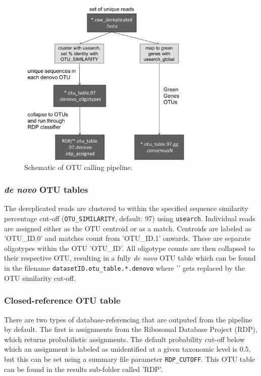 \documentclass[11pt, oneside]{article}   	%
\begin{document}
\begin{figure}
\centering
	\includegraphics[width=0.8\textwidth]{figs/OTU_calling.png}
\caption{Schematic of OTU calling pipeline.}
\end{figure}


\subsubsection{\textit{de novo} OTU tables}
The dereplicated reads are clustered to within the specified sequence similarity percentage cut-off ({\tt OTU\_SIMILARITY}, default: 97) using {\tt usearch}.  Individual reads are assigned either as the OTU centroid or as a match. Centroids are labeled as 'OTU\_ID.0' and matches count from 'OTU\_ID.1' onwards.  These are separate oligotypes within the OTU 'OTU\_ID'. All oligotype counts are then collapsed to their respective OTU, resulting in a fully \textit{de novo} OTU table which can be found in the filename {\tt datasetID.otu\_table.*.denovo} where '{\tt *}' gets replaced by the OTU similarity cut-off.

\subsubsection{Closed-reference OTU table}
There are two types of database-referencing that are outputed from the pipeline by default.  The first is assignments from the Ribosomal Database Project (RDP), which returns probabilistic assignments.  The default probability cut-off below which an assignment is labeled as unidentified at a given taxonomic level is 0.5, but this can be set using a summary file parameter {\tt RDP\_CUTOFF}.  This OTU table can be found in the results sub-folder called 'RDP'.
\end{document}
